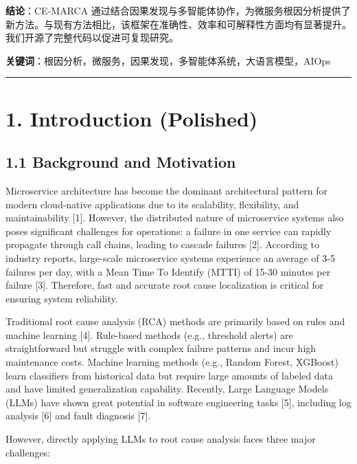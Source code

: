 \textbf{结论}：CE-MARCA
通过结合因果发现与多智能体协作，为微服务根因分析提供了新方法。与现有方法相比，该框架在准确性、效率和可解释性方面均有显著提升。我们开源了完整代码以促进可复现研究。

\textbf{关键词}：根因分析，微服务，因果发现，多智能体系统，大语言模型，AIOps

\begin{center}\rule{0.5\linewidth}{0.5pt}\end{center}

\hypertarget{introduction-polished}{%
\section{1. Introduction (Polished)}\label{introduction-polished}}

\hypertarget{background-and-motivation}{%
\subsection{1.1 Background and
Motivation}\label{background-and-motivation}}

Microservice architecture has become the dominant architectural pattern
for modern cloud-native applications due to its scalability,
flexibility, and maintainability {[}1{]}. However, the distributed
nature of microservice systems also poses significant challenges for
operations: a failure in one service can rapidly propagate through call
chains, leading to cascade failures {[}2{]}. According to industry
reports, large-scale microservice systems experience an average of 3-5
failures per day, with a Mean Time To Identify (MTTI) of 15-30 minutes
per failure {[}3{]}. Therefore, fast and accurate root cause
localization is critical for ensuring system reliability.

Traditional root cause analysis (RCA) methods are primarily based on
rules and machine learning {[}4{]}. Rule-based methods (e.g., threshold
alerts) are straightforward but struggle with complex failure patterns
and incur high maintenance costs. Machine learning methods (e.g., Random
Forest, XGBoost) learn classifiers from historical data but require
large amounts of labeled data and have limited generalization
capability. Recently, Large Language Models (LLMs) have shown great
potential in software engineering tasks {[}5{]}, including log analysis
{[}6{]} and fault diagnosis {[}7{]}.

However, directly applying LLMs to root cause analysis faces three major
challenges:

